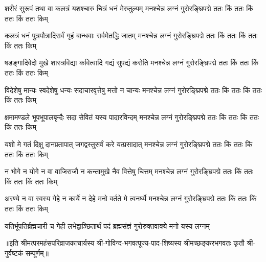 

\fourlineindentedshloka
{शरीरं सुरूपं तथा वा कलत्रं}
{यशश्चारु चित्रं धनं मेरुतुल्यम्}
{मनश्चेन्न लग्नं गुरोरङ्घ्रिपद्मे}
{ततः किं ततः किं ततः किं ततः किम्}%


 \fourlineindentedshloka
{कलत्रं धनं पुत्रपौत्रादिसर्वं}
{गृहं बान्धवाः सर्वमेतद्धि जातम्}
{मनश्चेन्न लग्नं गुरोरङ्घ्रिपद्मे}
{ततः किं ततः किं ततः किं ततः किम्}%


\fourlineindentedshloka
{षडङ्गादिवेदो मुखे शास्त्रविद्या}
{कवित्वादि गद्यं सुपद्यं करोति}
{मनश्चेन्न लग्नं गुरोरङ्घ्रिपद्मे}
{ततः किं ततः किं ततः किं ततः किम्}%


\fourlineindentedshloka
{विदेशेषु मान्यः स्वदेशेषु धन्यः}
{सदाचारवृत्तेषु मत्तो न चान्यः}
{मनश्चेन्न लग्नं गुरोरङ्घ्रिपद्मे}
{ततः किं ततः किं ततः किं ततः किम्}%


\fourlineindentedshloka
{क्षमामण्डले भूपभूपालबृन्दैः}
{सदा सेवितं यस्य पादारविन्दम्}
{मनश्चेन्न लग्नं गुरोरङ्घ्रिपद्मे}
{ततः किं ततः किं ततः किं ततः किम्}%

\fourlineindentedshloka
{यशो मे गतं दिक्षु दानप्रतापात्}
{जगद्वस्तुसर्वं करे यत्प्रसादात्}
{मनश्चेन्न लग्नं गुरोरङ्घ्रिपद्मे}
{ततः किं ततः किं ततः किं ततः किम्}%

\fourlineindentedshloka
{न भोगे न योगे न वा वाजिराजौ}
{न कन्तामुखे नैव वित्तेषु चित्तम्}
{मनश्चेन्न लग्नं गुरोरङ्घ्रिपद्मे}
{ततः किं ततः किं ततः किं ततः किम्}%


\fourlineindentedshloka
{अरण्ये न वा स्वस्य गेहे न कार्ये}
{न देहे मनो वर्तते मे त्वनर्घ्ये}
{मनश्चेन्न लग्नं गुरोरङ्घ्रिपद्मे}
{ततः किं ततः किं ततः किं ततः किम्}%


{यतिर्भूपतिर्ब्रह्मचारी च गेही}
{लभेद्वाञ्छितार्थं पदं ब्रह्मसंज्ञं}
{गुरोरुक्तवाक्ये मनो यस्य लग्नम्}%


॥इति श्रीमत्परमहंसपरिव्राजकाचार्यस्य श्री-गोविन्द-भगवत्पूज्य-पाद-शिष्यस्य
श्रीमच्छङ्करभगवतः कृतौ श्री-गुर्वष्टकं सम्पूर्णम्॥